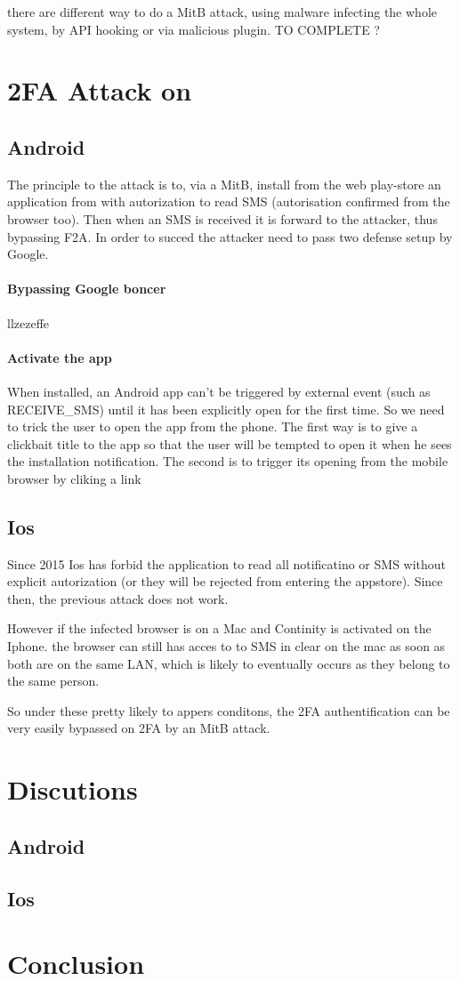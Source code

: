 \documentclass[11pt,conference,compsocconf]{IEEEtran}
\begin{document}
there are different way to do a MitB attack, using malware infecting the whole 
system, by API hooking or via malicious plugin. TO COMPLETE ?
\section{2FA Attack on }
\subsection{Android}
The principle to the attack is to, via a MitB, install from the web play-store an
application from with autorization to read SMS (autorisation confirmed from the browser 
too). Then when an SMS is received it is forward to the attacker, thus bypassing 
F2A. In order to succed the attacker need to pass two defense setup by Google.

\paragraph{Bypassing Google boncer} llzezeffe

\paragraph{Activate the app} When installed, an Android app can't be triggered 
by external event (such as RECEIVE\_SMS) until it has been explicitly open for 
the first time. So we need to trick the user to open the app from the phone. The 
first way is to give a clickbait title to the app so that the user will be 
tempted to open it when he sees the installation notification.
The second is to trigger its opening from the mobile browser by cliking a link

\subsection{Ios}
Since 2015 Ios has forbid the application to read all 
notificatino or SMS without explicit autorization (or they will be rejected from entering the appstore). 
Since then, the previous attack does not work. 

However if the infected browser is on a Mac and Continity 
is activated on the Iphone. the browser can still has acces to to SMS in clear 
on the mac as soon as both are on the same LAN, which is likely to eventually occurs
as they belong to the same person. 

So under these pretty likely to appers conditons, the 2FA authentification can 
be very easily bypassed on 2FA by an MitB attack.


\section{Discutions} 
\subsection{Android}
\subsection{Ios}
\section{Conclusion}

% 
%
\end{document}
